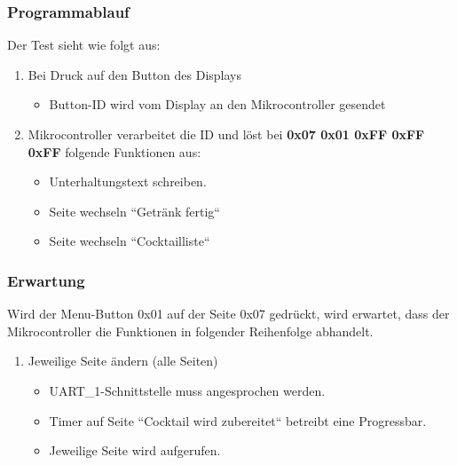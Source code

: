 \subsubsection{Programmablauf}\label{subsubsec:Hardware_Funktionstests_Programmablauf}

Der Test sieht wie folgt aus:

\begin{enumerate}
\item Bei Druck auf den Button des Displays
\begin{itemize}
\item Button-ID wird vom Display an den Mikrocontroller gesendet
\end{itemize}
\item Mikrocontroller verarbeitet die ID und löst bei \textbf{0x07 0x01 0xFF 0xFF 0xFF} folgende Funktionen aus:
\begin{itemize}
\item Unterhaltungstext schreiben.
\item Seite wechseln ``Getränk fertig``
\item Seite wechseln ``Cocktailliste``
\end{itemize}
\end{enumerate}

\subsubsection{Erwartung}\label{subsubsec:Hardware_Gesamtsystem_Erwartung2}

Wird der Menu-Button 0x01 auf der Seite 0x07 gedrückt, wird erwartet, dass der Mikrocontroller die Funktionen in folgender Reihenfolge abhandelt. 

\begin{enumerate}
\item Jeweilige Seite ändern (alle Seiten)
\begin{itemize}
\item UART\_1-Schnittstelle muss angesprochen werden.
\item Timer auf Seite ``Cocktail wird zubereitet`` betreibt eine Progressbar.
\item Jeweilige Seite wird aufgerufen.
\end{itemize}
\end{enumerate}
\newpage

